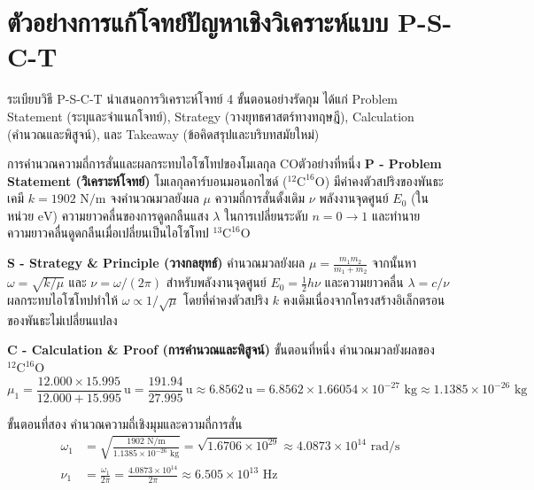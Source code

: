 \section{ตัวอย่างการแก้โจทย์ปัญหาเชิงวิเคราะห์แบบ P-S-C-T}
\label{sec_psct_examples_ch05}

ระเบียบวิธี P-S-C-T นำเสนอการวิเคราะห์โจทย์ 4 ขั้นตอนอย่างรัดกุม ได้แก่ Problem Statement (ระบุและจำแนกโจทย์), Strategy (วางยุทธศาสตร์ทางทฤษฎี), Calculation (คำนวณและพิสูจน์), และ Takeaway (ข้อคิดสรุปและบริบทสมัยใหม่)

\begin{psctbox}{การคำนวณความถี่การสั่นและผลกระทบไอโซโทปของโมเลกุล CO}{ตัวอย่างที่หนึ่ง}
\noindent\textbf{P - Problem Statement (วิเคราะห์โจทย์)} โมเลกุลคาร์บอนมอนอกไซด์ ($^{12}\text{C}^{16}\text{O}$) มีค่าคงตัวสปริงของพันธะเคมี $k = 1902\text{ N/m}$ จงคำนวณมวลยังผล $\mu$ ความถี่การสั่นดั้งเดิม $\nu$ พลังงานจุดศูนย์ $E_0$ (ในหน่วย $\text{eV}$) ความยาวคลื่นของการดูดกลืนแสง $\lambda$ ในการเปลี่ยนระดับ $n=0 \to 1$ และทำนายความยาวคลื่นดูดกลืนเมื่อเปลี่ยนเป็นไอโซโทป $^{13}\text{C}^{16}\text{O}$

\vspace{6pt}
\noindent\textbf{S - Strategy \& Principle (วางกลยุทธ์)} คำนวณมวลยังผล $\mu = \frac{m_1 m_2}{m_1 + m_2}$ จากนั้นหา $\omega = \sqrt{k/\mu}$ และ $\nu = \omega/(2\pi)$ สำหรับพลังงานจุดศูนย์ $E_0 = \frac{1}{2}h\nu$ และความยาวคลื่น $\lambda = c/\nu$ ผลกระทบไอโซโทปทำให้ $\omega \propto 1/\sqrt{\mu}$ โดยที่ค่าคงตัวสปริง $k$ คงเดิมเนื่องจากโครงสร้างอิเล็กตรอนของพันธะไม่เปลี่ยนแปลง

\vspace{6pt}
\noindent\textbf{C - Calculation \& Proof (การคำนวณและพิสูจน์)}
ขั้นตอนที่หนึ่ง คำนวณมวลยังผลของ $^{12}\text{C}^{16}\text{O}$
\begin{equation}
\mu_1 = \frac{12.000 \times 15.995}{12.000 + 15.995} \, \text{u} = \frac{191.94}{27.995} \, \text{u} \approx 6.8562 \, \text{u} = 6.8562 \times 1.66054 \times 10^{-27}\text{ kg} \approx 1.1385 \times 10^{-26}\text{ kg}
\end{equation}

ขั้นตอนที่สอง คำนวณความถี่เชิงมุมและความถี่การสั่น
\begin{align}
\omega_1 &= \sqrt{\frac{1902\text{ N/m}}{1.1385 \times 10^{-26}\text{ kg}}} = \sqrt{1.6706 \times 10^{29}} \approx 4.0873 \times 10^{14}\text{ rad/s} \\
\nu_1 &= \frac{\omega_1}{2\pi} = \frac{4.0873 \times 10^{14}}{2\pi} \approx 6.505 \times 10^{13}\text{ Hz}
\end{align}


\end{psctbox}
